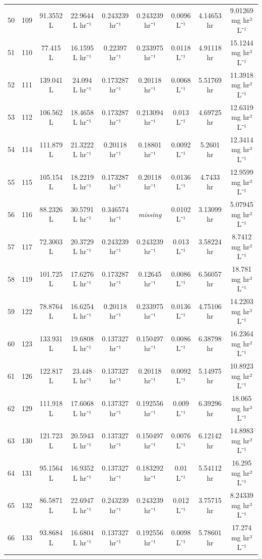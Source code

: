\documentclass[12pt,a4paper]{article}
\begin{document}
\begin{tabular}{r|cccccccc}
	50 & 109 & 91.3552 L & 22.9644 L hr⁻¹ & 0.243239 hr⁻¹ & 0.243239 hr⁻¹ & 0.0096 L⁻¹ & 4.14653 hr & 9.01269 mg hr² L⁻¹ \\
	51 & 110 & 77.415 L & 16.1595 L hr⁻¹ & 0.22397 hr⁻¹ & 0.233975 hr⁻¹ & 0.0118 L⁻¹ & 4.91118 hr & 15.1244 mg hr² L⁻¹ \\
	52 & 111 & 139.041 L & 24.094 L hr⁻¹ & 0.173287 hr⁻¹ & 0.20118 hr⁻¹ & 0.0068 L⁻¹ & 5.51769 hr & 11.3918 mg hr² L⁻¹ \\
	53 & 112 & 106.562 L & 18.4658 L hr⁻¹ & 0.173287 hr⁻¹ & 0.213094 hr⁻¹ & 0.013 L⁻¹ & 4.69725 hr & 12.6319 mg hr² L⁻¹ \\
	54 & 114 & 111.879 L & 21.3222 L hr⁻¹ & 0.20118 hr⁻¹ & 0.18801 hr⁻¹ & 0.0092 L⁻¹ & 5.2601 hr & 12.3414 mg hr² L⁻¹ \\
	55 & 115 & 105.154 L & 18.2219 L hr⁻¹ & 0.173287 hr⁻¹ & 0.20118 hr⁻¹ & 0.0136 L⁻¹ & 4.7433 hr & 12.9599 mg hr² L⁻¹ \\
	56 & 116 & 88.2326 L & 30.5791 L hr⁻¹ & 0.346574 hr⁻¹ & \emph{missing} & 0.0102 L⁻¹ & 3.13099 hr & 5.07945 mg hr² L⁻¹ \\
	57 & 117 & 72.3003 L & 20.3729 L hr⁻¹ & 0.243239 hr⁻¹ & 0.243239 hr⁻¹ & 0.013 L⁻¹ & 3.58224 hr & 8.7412 mg hr² L⁻¹ \\
	58 & 119 & 101.725 L & 17.6276 L hr⁻¹ & 0.173287 hr⁻¹ & 0.12645 hr⁻¹ & 0.0086 L⁻¹ & 6.56057 hr & 18.781 mg hr² L⁻¹ \\
	59 & 122 & 78.8764 L & 16.6254 L hr⁻¹ & 0.20118 hr⁻¹ & 0.233975 hr⁻¹ & 0.0136 L⁻¹ & 4.75106 hr & 14.2203 mg hr² L⁻¹ \\
	60 & 123 & 133.931 L & 19.6808 L hr⁻¹ & 0.137327 hr⁻¹ & 0.150497 hr⁻¹ & 0.0086 L⁻¹ & 6.38798 hr & 16.2364 mg hr² L⁻¹ \\
	61 & 126 & 122.817 L & 23.448 L hr⁻¹ & 0.137327 hr⁻¹ & 0.20118 hr⁻¹ & 0.0092 L⁻¹ & 5.14975 hr & 10.8923 mg hr² L⁻¹ \\
	62 & 129 & 111.918 L & 17.6068 L hr⁻¹ & 0.137327 hr⁻¹ & 0.192556 hr⁻¹ & 0.009 L⁻¹ & 6.39296 hr & 18.065 mg hr² L⁻¹ \\
	63 & 130 & 121.723 L & 20.5943 L hr⁻¹ & 0.137327 hr⁻¹ & 0.150497 hr⁻¹ & 0.0076 L⁻¹ & 6.12142 hr & 14.8983 mg hr² L⁻¹ \\
	64 & 131 & 95.1564 L & 16.9352 L hr⁻¹ & 0.137327 hr⁻¹ & 0.183292 hr⁻¹ & 0.01 L⁻¹ & 5.54112 hr & 16.295 mg hr² L⁻¹ \\
	65 & 132 & 86.5871 L & 22.6947 L hr⁻¹ & 0.243239 hr⁻¹ & 0.243239 hr⁻¹ & 0.012 L⁻¹ & 3.75715 hr & 8.24339 mg hr² L⁻¹ \\
	66 & 133 & 93.8684 L & 16.6804 L hr⁻¹ & 0.137327 hr⁻¹ & 0.192556 hr⁻¹ & 0.0098 L⁻¹ & 5.78601 hr & 17.274 mg hr² L⁻¹ \\

\end{tabular}
\end{document}
